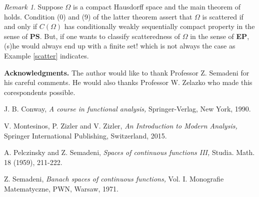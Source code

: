 \documentclass[11pt,bezier,epsf]{amsart}
\theoremstyle{definition}
\theoremstyle{remark}
\newtheorem{rem}[thm]{Remark}
\numberwithin{equation}{section}
\begin{document}
\begin{rem}
Suppose $\varOmega$ is a compact Hausdorff space and the main theorem of
\cite[p.214]{Semadeni} holds. Condition (0) and (9) of the latter theorem assert
that $\varOmega$ is scattered if and only if $C(\varOmega)$ has
 conditionally weakly sequentially compact property in the sense of {\bf PS}. But, if one wants to classify scatteredness of $\varOmega$ in the sense of {\bf EP}, (s)he would always end up with a finite set! which is not always the case as Example \ref{scatter} indicates.
\end{rem}

{\bf Acknowledgments.} The author would like to thank Professor Z. Semadeni for his careful comments. He would also thanks Professor W. Zelazko who made this corespondents possible. 


\begin{thebibliography}{1}


 J. B. Conway, {\it A course in functional analysis,}
Springer-Verlag, New York, 1990.

 V. Montesinos, P. Zizler and V. Zizler, {\it An Introduction to
Modern Analysis,} Springer International Publishing, Switzerland, 2015.

 A. Pelczinsky and  Z. Semadeni, {\it Spaces of continuous
functions III,}
Studia. Math. 18 (1959), 211-222.

 Z. Semadeni, {\it Banach spaces of continuous
functions,} Vol. I. Monografie Matematyczne, PWN, Warsaw, 1971.




\end{thebibliography}
\end{document}
